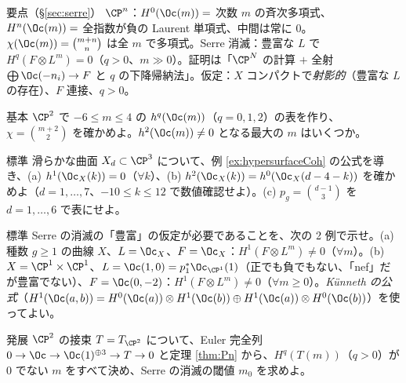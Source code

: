 \begin{keybox}{要点（\S\ref{sec:serre}）}
$\CP^n$：$H^0(\Oc(m))=$ 次数 $m$ の斉次多項式、$H^n(\Oc(m))=$ 全指数が負の Laurent 単項式、中間は常に $0$。$\chi(\Oc(m))=\binom{m+n}n$ は全 $m$ で多項式。Serre 消滅：豊富な $L$ で $H^q(F\otimes L^m)=0$（$q>0$、$m\gg0$）。証明は「$\CP^N$ の計算 $+$ 全射 $\bigoplus\Oc(-n_i)\to F$ と $q$ の下降帰納法」。仮定：$X$ コンパクトで\emph{射影的}（豊富な $L$ の存在）、$F$ 連接、$q>0$。
\end{keybox}

\begin{prob}{基本}\label{p:tableP2}
$\CP^2$ で $-6\le m\le4$ の $h^q(\Oc(m))$（$q=0,1,2$）の表を作り、$\chi=\binom{m+2}2$ を確かめよ。$h^2(\Oc(m))\ne0$ となる最大の $m$ はいくつか。
\end{prob}
\begin{prob}{標準}\label{p:hypsurf}
滑らかな曲面 $X_d\subset\CP^3$ について、例 \ref{ex:hypersurfaceCoh} の公式を導き、(a) $h^1(\Oc_X(k))=0$（$\forall k$）、(b) $h^2(\Oc_X(k))=h^0(\Oc_X(d-4-k))$ を確かめよ（$d=1,\dots,7$、$-10\le k\le12$ で数値確認せよ）。(c) $p_g=\binom{d-1}3$ を $d=1,\dots,6$ で表にせよ。
\end{prob}
\begin{prob}{標準}\label{p:SerreFail}
Serre の消滅の「豊富」の仮定が必要であることを、次の 2 例で示せ。(a) 種数 $g\ge1$ の曲線 $X$、$L=\Oc_X$、$F=\Oc_X$：$H^1(F\otimes L^m)\ne0$（$\forall m$）。(b) $X=\CP^1\times\CP^1$、$L=\Oc(1,0)=p_1^*\Oc_{\CP^1}(1)$（正でも負でもない、「nef」だが豊富でない）、$F=\Oc(0,-2)$：$H^1(F\otimes L^m)\ne0$（$\forall m\ge0$）。\emph{Künneth の公式}（$H^1(\Oc(a,b))=H^0(\Oc(a))\otimes H^1(\Oc(b))\oplus H^1(\Oc(a))\otimes H^0(\Oc(b))$）を使ってよい。
\end{prob}
\begin{prob}{発展}\label{p:TP2}
$\CP^2$ の接束 $T=T_{\CP^2}$ について、Euler 完全列 $0\to\Oc\to\Oc(1)^{\oplus3}\to T\to0$ と定理 \ref{thm:Pn} から、$H^q(T(m))$（$q>0$）が $0$ でない $m$ をすべて決め、Serre の消滅の閾値 $m_0$ を求めよ。
\end{prob}


